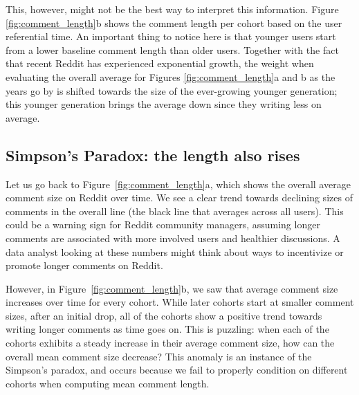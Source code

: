 This, however, might not be the best way to interpret this information. Figure \ref{fig:comment_length}b shows the comment length per cohort based on the user referential time.  
An important thing to notice here is that younger users start from a lower baseline comment length than older users. Together with the fact that recent Reddit has experienced exponential growth, the weight when evaluating the overall average for Figures \ref{fig:comment_length}a and b as the years go by is shifted towards the size of the ever-growing younger generation; this younger generation brings the average down since they writing less on average.


\subsection{Simpson's Paradox: the length also rises}

Let us go back to Figure~\ref{fig:comment_length}a, which shows the overall average comment size on Reddit over time. We see a clear trend towards declining sizes of comments in the overall line (the black line that averages across all users).
This could be a warning sign for Reddit community managers, assuming longer comments are associated with more involved users and healthier discussions. A data analyst looking at these numbers might think about ways to incentivize or promote longer comments on Reddit. 

However, in Figure~\ref{fig:comment_length}b, we saw that average comment size increases over time for every cohort. While later cohorts start at smaller comment sizes, after an initial drop, all of the cohorts show a positive trend towards writing longer comments as time goes on.  This is puzzling: when each of the cohorts exhibits a steady increase in their average comment size, how can the overall mean comment size decrease?  This anomaly is an instance of the Simpson's paradox, and occurs because we fail to properly condition on different cohorts when computing mean comment length. 


